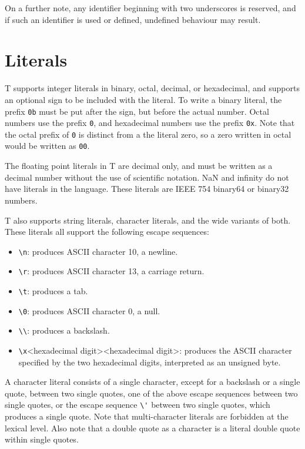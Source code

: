 \documentclass[letterpaper,12pt]{book}
\begin{document}
On a further note, any identifier beginning with two underscores is reserved, and if such an identifier is used or defined, undefined behaviour may result.

\section{Literals}

T supports integer literals in binary, octal, decimal, or hexadecimal, and supports an optional sign to be included with the literal. To write a binary literal, the prefix \texttt{0b} must be put after the sign, but before the actual number. Octal numbers use the prefix \texttt{0}, and hexadecimal numbers use the prefix \texttt{0x}. Note that the octal prefix of \texttt{0} is distinct from a the literal zero, so a zero written in octal would be written as \texttt{00}.

The floating point literals in T are decimal only, and must be written as a decimal number without the use of scientific notation. NaN and infinity do not have literals in the language. These literals are IEEE 754 binary64 or binary32 numbers.

T also supports string literals, character literals, and the wide variants of both. These literals all support the following escape sequences:

\begin{itemize}
	\item \verb|\n|: produces ASCII character 10, a newline.
	\item \verb|\r|: produces ASCII character 13, a carriage return.
	\item \verb|\t|: produces a tab.
	\item \verb|\0|: produces ASCII character 0, a null.
	\item \verb|\\|: produces a backslash.
	\item \verb|\x|{\textless}hexadecimal digit{\textgreater}{\textless}hexadecimal digit{\textgreater}: produces the ASCII character specified by the two hexadecimal digits, interpreted as an unsigned byte.
\end{itemize}

A character literal consists of a single character, except for a backslash or a single quote, between two single quotes, one of the above escape sequences between two single quotes, or the escape sequence \verb|\'| between two single quotes, which produces a single quote. Note that multi-character literals are forbidden at the lexical level. Also note that a double quote as a character is a literal double quote within single quotes.
\end{document}
